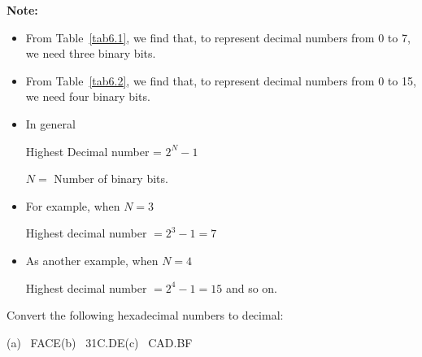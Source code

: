 \noindent
{\bf Note:}
\begin{itemize}
\item From Table~\ref{tab6.1}, we find that, to represent decimal numbers from 0 to 7, we need three binary bits.

\item From Table~\ref{tab6.2}, we find that, to represent decimal numbers from 0 to 15, we need four binary bits.

\item In general

Highest Decimal number = $2^{N}-1$

$N=$ Number of binary bits.

\item For example, when $N=3$

Highest decimal number $=2^{3}-1=7$

\item As another example, when $N=4$

Highest decimal number $=2^{4}-1=15$ and so on.
\end{itemize}

\begin{example}\label{exam6.9}
Convert the following hexadecimal numbers to decimal:
\begin{center}
(a)~ FACE\qquad (b)~ 31C.DE\qquad (c)~ CAD.BF
\end{center}
\end{example}

